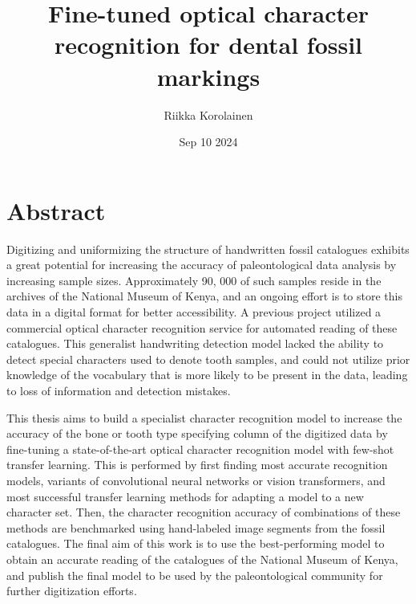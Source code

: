 \documentclass{article}
\title{Fine-tuned optical character recognition for dental fossil markings}
\author{Riikka Korolainen}
\date{Sep 10 2024}
\begin{document}
\maketitle

\section*{Abstract}


Digitizing and uniformizing the structure of handwritten fossil catalogues exhibits a great 
potential for increasing the accuracy of paleontological data analysis by increasing sample sizes. 
Approximately 90, 000 of such samples reside in the archives of the National Museum of Kenya, and 
an ongoing effort is to store this data in a digital format for better accessibility.
A previous project utilized a commercial optical character recognition service for automated reading of these catalogues. This generalist
handwriting detection model lacked the ability to detect special characters used to denote tooth samples, and could not utilize prior knowledge 
of the vocabulary that is more likely to be present in the data, leading to loss of information and detection mistakes.

This thesis aims to build a specialist character recognition model to increase the accuracy of 
the bone or tooth type specifying column of the digitized data by fine-tuning a state-of-the-art optical 
character recognition model with few-shot transfer learning. This is performed by first finding most accurate
recognition models, variants of convolutional neural networks or vision transformers, and most successful 
transfer learning methods for adapting a model to a new character set. Then, the character 
recognition accuracy of combinations of these methods are benchmarked using hand-labeled image segments from the 
fossil catalogues. The final aim of this work is to use the best-performing model 
to obtain an accurate reading of the catalogues of the National Museum of Kenya, and publish the final model to be used 
by the paleontological community for further digitization efforts.
\end{document}
